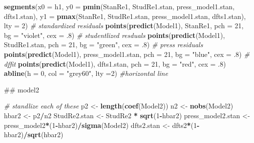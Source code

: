 \documentclass[]{article}
\newenvironment{Shaded}{\begin{snugshade}}{\end{snugshade}}
\newcommand{\KeywordTok}[1]{\textcolor[rgb]{0.13,0.29,0.53}{\textbf{#1}}}
\newcommand{\DataTypeTok}[1]{\textcolor[rgb]{0.13,0.29,0.53}{#1}}
\newcommand{\DecValTok}[1]{\textcolor[rgb]{0.00,0.00,0.81}{#1}}
\newcommand{\StringTok}[1]{\textcolor[rgb]{0.31,0.60,0.02}{#1}}
\newcommand{\CommentTok}[1]{\textcolor[rgb]{0.56,0.35,0.01}{\textit{#1}}}
\newcommand{\OperatorTok}[1]{\textcolor[rgb]{0.81,0.36,0.00}{\textbf{#1}}}
\newcommand{\NormalTok}[1]{#1}
\begin{document}
\begin{Shaded}
\begin{Highlighting}[]
\KeywordTok{segments}\NormalTok{(}\DataTypeTok{x0 =}\NormalTok{ h1,}
         \DataTypeTok{y0 =} \KeywordTok{pmin}\NormalTok{(StanRe1, StudRe1.stan, press_model1.stan, dfts1.stan),}
         \DataTypeTok{y1 =} \KeywordTok{pmax}\NormalTok{(StanRe1, StudRe1.stan, press_model1.stan, dfts1.stan), }
         \DataTypeTok{lty =} \DecValTok{2}\NormalTok{)}
\CommentTok{# standardized residuals}
\KeywordTok{points}\NormalTok{(}\KeywordTok{predict}\NormalTok{(Model1), StanRe1, }\DataTypeTok{pch =} \DecValTok{21}\NormalTok{, }\DataTypeTok{bg =} \StringTok{"violet"}\NormalTok{, }\DataTypeTok{cex =}\NormalTok{ .}\DecValTok{8}\NormalTok{) }
\CommentTok{# studentlized resduals}
\KeywordTok{points}\NormalTok{(}\KeywordTok{predict}\NormalTok{(Model1), StudRe1.stan, }\DataTypeTok{pch =} \DecValTok{21}\NormalTok{, }\DataTypeTok{bg =} \StringTok{"green"}\NormalTok{, }\DataTypeTok{cex =}\NormalTok{ .}\DecValTok{8}\NormalTok{) }
\CommentTok{# press residuals}
\KeywordTok{points}\NormalTok{(}\KeywordTok{predict}\NormalTok{(Model1), press_model1.stan, }\DataTypeTok{pch =} \DecValTok{21}\NormalTok{, }\DataTypeTok{bg =} \StringTok{"blue"}\NormalTok{, }\DataTypeTok{cex =}\NormalTok{ .}\DecValTok{8}\NormalTok{)}
\CommentTok{# dffit}
\KeywordTok{points}\NormalTok{(}\KeywordTok{predict}\NormalTok{(Model1), dfts1.stan, }\DataTypeTok{pch =} \DecValTok{21}\NormalTok{, }\DataTypeTok{bg =} \StringTok{"red"}\NormalTok{, }\DataTypeTok{cex =}\NormalTok{ .}\DecValTok{8}\NormalTok{) }
\KeywordTok{abline}\NormalTok{(}\DataTypeTok{h =} \DecValTok{0}\NormalTok{, }\DataTypeTok{col =} \StringTok{"grey60"}\NormalTok{, }\DataTypeTok{lty =}\DecValTok{2}\NormalTok{) }\CommentTok{#horizontal line}

\NormalTok{## model2}

\CommentTok{# standlize each of these}
\NormalTok{p2 <-}\StringTok{ }\KeywordTok{length}\NormalTok{(}\KeywordTok{coef}\NormalTok{(Model2))}
\NormalTok{n2 <-}\StringTok{ }\KeywordTok{nobs}\NormalTok{(Model2)}
\NormalTok{hbar2 <-}\StringTok{ }\NormalTok{p2}\OperatorTok{/}\NormalTok{n2}
\NormalTok{StudRe2.stan <-}\StringTok{ }\NormalTok{StudRe2 }\OperatorTok{*}\StringTok{ }\KeywordTok{sqrt}\NormalTok{(}\DecValTok{1}\OperatorTok{-}\NormalTok{hbar2)}
\NormalTok{press_model2.stan <-}\StringTok{ }\NormalTok{press_model2}\OperatorTok{*}\NormalTok{(}\DecValTok{1}\OperatorTok{-}\NormalTok{hbar2)}\OperatorTok{/}\KeywordTok{sigma}\NormalTok{(Model2)}
\NormalTok{dfts2.stan <-}\StringTok{ }\NormalTok{dfts2}\OperatorTok{*}\NormalTok{(}\DecValTok{1}\OperatorTok{-}\NormalTok{hbar2)}\OperatorTok{/}\KeywordTok{sqrt}\NormalTok{(hbar2)}


\end{Highlighting}
\end{Shaded}
\end{document}
